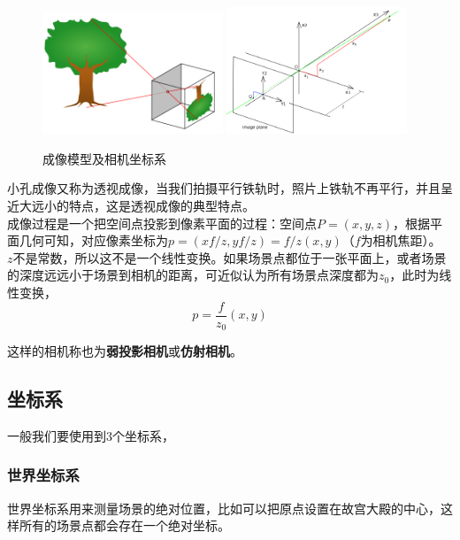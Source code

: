 \documentclass[hpyerref,UTF8,a4paper,titlepage,12pt,oneside]{ctexbook}
\theoremstyle{definition}
\begin{document}
	\begin{figure}[H]
		\begin{center}
			\includegraphics[width=0.48\textwidth]{../images/pinhole.png}
			\includegraphics[width=0.48\textwidth]{../images/pinhole_coor.png}
		\end{center}
		\caption{成像模型及相机坐标系}
	\end{figure}

	小孔成像又称为透视成像，当我们拍摄平行铁轨时，照片上铁轨不再平行，并且呈近大远小的特点，这是透视成像的典型特点。\\

	成像过程是一个把空间点投影到像素平面的过程：空间点$P=(x,y,z)$，根据平面几何可知，对应像素坐标为$p = (xf/z, yf/z) = f/z(x,y)$（$f$为相机焦距）。\\
	
	$z$不是常数，所以这不是一个线性变换。如果场景点都位于一张平面上，或者场景的深度远远小于场景到相机的距离，可近似认为所有场景点深度都为$z_0$，此时为线性变换，
	$$
		p = \frac{f}{z_0}(x,y)
	$$

	这样的相机称也为\textbf{弱投影相机}或\textbf{仿射相机}。

\subsection{坐标系}
	一般我们要使用到3个坐标系，

	\subsubsection*{世界坐标系}
		世界坐标系用来测量场景的绝对位置，比如可以把原点设置在故宫大殿的中心，这样所有的场景点都会存在一个绝对坐标。\\
\end{document}

